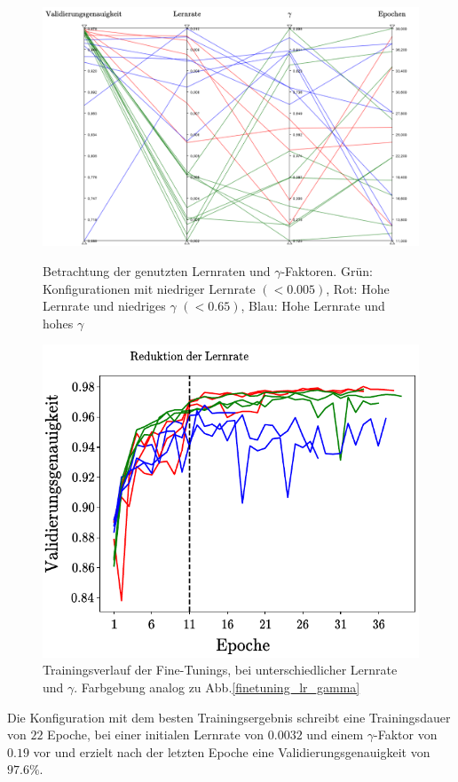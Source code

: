 \begin{figure}[h]
\includegraphics[scale=0.58]{NNOPT/finetuning_lr_gamma.pdf}
\caption{Betrachtung der genutzten Lernraten und $\gamma$-Faktoren. Grün: Konfigurationen mit niedriger Lernrate $(<0.005)$, Rot: Hohe Lernrate und niedriges $\gamma$ $(<0.65)$, Blau: Hohe Lernrate und hohes $\gamma$}
\label{finetuning_lr_gamma}

\centering
\includegraphics[scale=1]{NNOPT/finetuning_lr_gamma_verlauf.pdf}
\caption{Trainingsverlauf der Fine-Tunings, bei unterschiedlicher Lernrate und $\gamma$. Farbgebung analog zu Abb.\ref{finetuning_lr_gamma}}
\label{finetuning_lr_gamma_verlauf}
\end{figure}
\clearpage
Die Konfiguration mit dem besten Trainingsergebnis schreibt eine Trainingsdauer von $22$ Epoche, bei einer initialen Lernrate von $0.0032$ und einem $\gamma$-Faktor von $0.19$ vor und erzielt nach der letzten Epoche eine Validierungsgenauigkeit von $97.6\%$.
